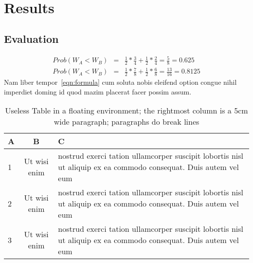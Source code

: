 \chapter{Results}
\label{cha:thesis_outcome}

\section{Evaluation}
\label{sec:evaluation}


\begin{eqnarray} \label{eqn:formula}
    Prob(W_A < W_B) &=& \frac{1}{2} * \frac{3}{4} + \frac{1}{2} * \frac{2}{4} = \frac{5}{8} = 0.625 \\
    Prob(W_A < W_B) &=& \frac{1}{2} * \frac{7}{8} + \frac{1}{2} * \frac{6}{8} = \frac{13}{16} = 0.8125
\end{eqnarray}
Nam liber tempor~\autoref{eqn:formula} cum soluta nobis eleifend option congue nihil imperdiet doming id quod mazim placerat facer possim assum.

\begin{table}
    \centering
    \begin{tabular}{l|c|p{5cm}} \toprule
        A & B & C \\ \midrule
        1 & Ut wisi enim & nostrud exerci tation ullamcorper suscipit lobortis nisl ut aliquip ex ea commodo consequat. Duis autem vel eum \\
        2 & Ut wisi enim & nostrud exerci tation ullamcorper suscipit lobortis nisl ut aliquip ex ea commodo consequat. Duis autem vel eum \\
        3 & Ut wisi enim & nostrud exerci tation ullamcorper suscipit lobortis nisl ut aliquip ex ea commodo consequat. Duis autem vel eum \\
        \bottomrule
    \end{tabular}
    \caption[Useless Table]{Useless Table in a floating environment; the rightmost column is a 5cm wide paragraph; paragraphs do break lines}
    \label{tab:table}
\end{table}
